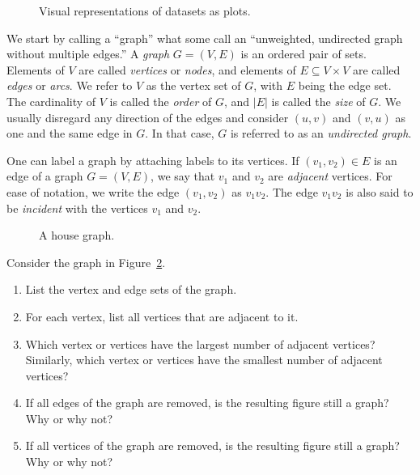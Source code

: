 \begin{figure}[!htbp]
\centering

\caption{Visual representations of datasets as plots.}
\label{fig:introduction:graphs_as_plots}
\end{figure}

We start by calling a ``graph'' what some call an ``unweighted,
undirected graph without multiple edges.'' A \emph{graph}
$G = (V, E)$ is an ordered pair of sets. Elements of $V$ are called
\emph{vertices} or \emph{nodes}, and elements of
$E \subseteq V \times V$ are called \emph{edges} or
\emph{arcs}. We refer to $V$ as the vertex set of $G$, with $E$ being
the edge set. The cardinality of $V$ is called the
\emph{order} of $G$, and $|E|$ is called the
\emph{size} of $G$. We usually disregard any direction of
the edges and consider $(u,v)$ and $(v,u)$ as one and the same edge in
$G$. In that case, $G$ is referred to as an
\emph{undirected graph}.

One can label a graph by attaching labels to its vertices. If $(v_1,
v_2) \in E$ is an edge of a graph $G = (V, E)$, we say that $v_1$ and
$v_2$ are \emph{adjacent} vertices. For ease of notation, we write the
edge $(v_1, v_2)$ as $v_1 v_2$. The edge $v_1 v_2$ is also said to be
\emph{incident} with the vertices $v_1$ and $v_2$.

\begin{figure}[!htbp]
\centering

\caption{A house graph.}
\label{fig:introduction:house_graph}
\end{figure}

\begin{example}
\label{eg:introduction:house_graph}
Consider the graph in Figure~\ref{fig:introduction:house_graph}.
%
\begin{enumerate}
\item List the vertex and edge sets of the graph.

\item For each vertex, list all vertices that are adjacent to it.

\item Which vertex or vertices have the largest number of adjacent
  vertices? Similarly, which vertex or vertices have the smallest
  number of adjacent vertices?

\item If all edges of the graph are removed, is the resulting figure
  still a graph? Why or why not?

\item If all vertices of the graph are removed, is the resulting
  figure still a graph? Why or why not?
\end{enumerate}
\end{example}

